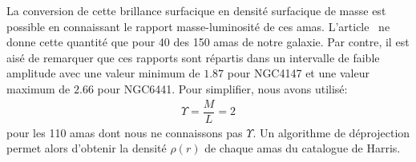 				La conversion de cette brillance surfacique en densité surfacique de masse est possible
				en connaissant le rapport masse-luminosité de ces amas. L'article~\cite{McL} ne donne cette
				quantité que pour 40 des 150 amas de notre galaxie.
				Par contre, il est aisé de remarquer que ces rapports sont %
				répartis dans un intervalle de faible amplitude
				avec une
				valeur minimum de $1.87$ pour NGC4147 et une valeur maximum de
				$2.66$ pour NGC6441. Pour simplifier, nous avons utilisé:
				\begin{align}
					\Upsilon = \dfrac{M}{L} = 2
				\end{align}
				pour les 110 amas dont nous ne connaissons pas $\Upsilon$. %
				Un algorithme de déprojection permet alors d'obtenir la densité $\rho(r)$ de chaque amas du catalogue de Harris.

